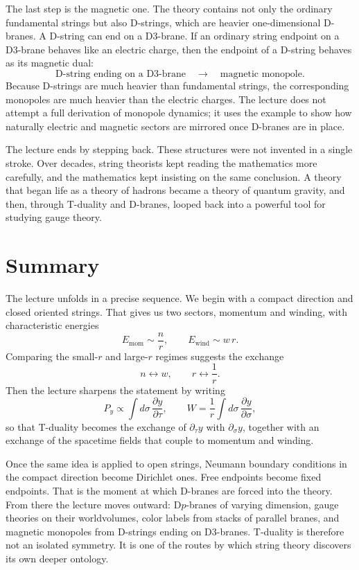 The last step is the magnetic one. The theory contains not only the ordinary fundamental strings but also D-strings, which are heavier one-dimensional D-branes. A D-string can end on a D3-brane. If an ordinary string endpoint on a D3-brane behaves like an electric charge, then the endpoint of a D-string behaves as its magnetic dual:
\begin{equation}
\text{D-string ending on a D3-brane}
\quad\longrightarrow\quad
\text{magnetic monopole}.
\end{equation}
Because D-strings are much heavier than fundamental strings, the corresponding monopoles are much heavier than the electric charges. The lecture does not attempt a full derivation of monopole dynamics; it uses the example to show how naturally electric and magnetic sectors are mirrored once D-branes are in place.

The lecture ends by stepping back. These structures were not invented in a single stroke. Over decades, string theorists kept reading the mathematics more carefully, and the mathematics kept insisting on the same conclusion. A theory that began life as a theory of hadrons became a theory of quantum gravity, and then, through T-duality and D-branes, looped back into a powerful tool for studying gauge theory.

\section{Summary}

The lecture unfolds in a precise sequence. We begin with a compact direction and closed oriented strings. That gives us two sectors, momentum and winding, with characteristic energies
\begin{equation}
E_{\text{mom}} \sim \frac{n}{r},
\qquad
E_{\text{wind}} \sim w\,r.
\end{equation}
Comparing the small-\(r\) and large-\(r\) regimes suggests the exchange
\begin{equation}
n\leftrightarrow w,
\qquad
r\leftrightarrow \frac{1}{r}.
\end{equation}
Then the lecture sharpens the statement by writing
\begin{equation}
P_y \propto \int d\sigma\,\frac{\partial y}{\partial \tau},
\qquad
W=\frac{1}{r}\int d\sigma\,\frac{\partial y}{\partial \sigma},
\end{equation}
so that T-duality becomes the exchange of \(\partial_\tau y\) with \(\partial_\sigma y\), together with an exchange of the spacetime fields that couple to momentum and winding.

Once the same idea is applied to open strings, Neumann boundary conditions in the compact direction become Dirichlet ones. Free endpoints become fixed endpoints. That is the moment at which D-branes are forced into the theory. From there the lecture moves outward: D\(p\)-branes of varying dimension, gauge theories on their worldvolumes, color labels from stacks of parallel branes, and magnetic monopoles from D-strings ending on D3-branes. T-duality is therefore not an isolated symmetry. It is one of the routes by which string theory discovers its own deeper ontology.